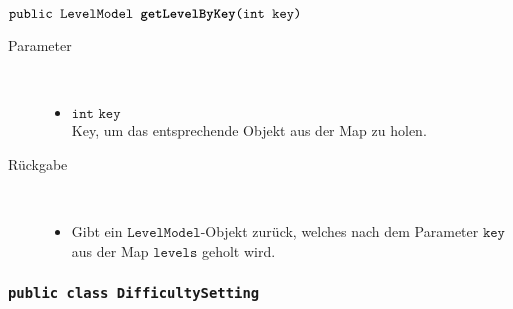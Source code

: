 \begin{description}
		\item $\texttt{public LevelModel \textbf{getLevelByKey}(int key)}$ \\ 
		\begin{description}
			\item[Parameter] \hfill \\
			\vspace{-.8cm}
			\begin{itemize}
				\item $\texttt{int key}$ \\ Key, um das entsprechende Objekt aus der Map zu holen.
			\end{itemize}
			\item[Rückgabe] \hfill \\
			\vspace{-.8cm}
			\begin{itemize}
				\item Gibt ein $\texttt{LevelModel}$-Objekt zurück, welches nach dem Parameter $\texttt{key}$ aus der Map $\texttt{levels}$ geholt wird.
			\end{itemize}
			\end{description}
			
	\end{description}
			
\subsubsection{\normalfont \texttt{public class \textbf{DifficultySetting}}}

